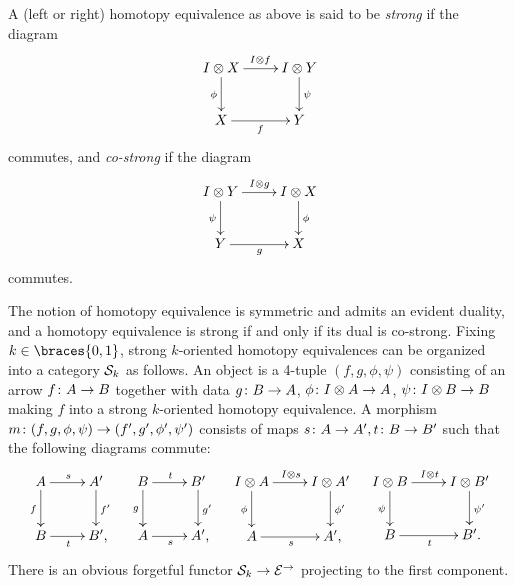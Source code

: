 \documentclass[reqno,10pt,a4paper,oneside,draft]{amsart}
\begin{document}
\begin{definition} \label{def:strhe}
A (left or right) homotopy equivalence as above is said to be \emph{strong} if the diagram
\[
\xymatrix{
  \interval \otimes X
  \ar[r]^{\interval \otimes f}
  \ar[d]_{\phi}
&
  \interval \otimes Y
  \ar[d]^{\psi}
\\
  X
  \ar[r]_{f}
&
  Y
}
\]
commutes, and \emph{co-strong} if the diagram
\[
\xymatrix{
  \interval \otimes Y
  \ar[r]^{\interval \otimes g}
  \ar[d]_{\psi}
&
  \interval \otimes X
  \ar[d]^{\phi}
\\
  Y
  \ar[r]_{g}
&
  X
}
\]
commutes.
\end{definition}

The notion of homotopy equivalence is symmetric and admits an evident duality, and a homotopy equivalence is strong if and only if its dual is co-strong.
Fixing $k \in \braces{0, 1}$, strong $k$-oriented homotopy equivalences can be organized into a category $\cal{S}_k$ as follows.
An object is a 4-tuple $(f, g, \phi, \psi)$ consisting of an arrow $f \co A \to B$ together with data $g \co B \to A$, $\phi \co \interval \otimes A \to A$, $\psi \co \interval \otimes B \to B$ making $f$ into a strong $k$-oriented homotopy equivalence.
A morphism $m \co (f, g, \phi, \psi) \to (f', g', \phi', \psi')$ consists of maps $s \co A \to A', t \co B \to B'$ such that the following diagrams commute:
\begin{align*}
\xymatrix{
  A
  \ar[r]^{s}
  \ar[d]_{f}
&
  A'
  \ar[d]^{f'}
\\
  B
  \ar[r]_{t}
&
  B'
\rlap{,}}
&&
\xymatrix{
  B
  \ar[r]^{t}
  \ar[d]_{g}
&
  B'
  \ar[d]^{g'}
\\
  A
  \ar[r]_{s}
&
  A'
\rlap{,}}
&&
\xymatrix{
  \interval \otimes A
  \ar[d]_{\phi}
  \ar[r]^{\interval \otimes s}
&
  I \otimes A'
  \ar[d]^{\phi'}
\\
  A
  \ar[r]_{s}
&
  A'
\rlap{,}}
&&
\xymatrix{
  \interval \otimes B
  \ar[d]_{\psi}
  \ar[r]^{\interval \otimes t}
&
  I \otimes B'
  \ar[d]^{\psi'}
\\
  B
  \ar[r]_{t}
&
  B'
\rlap{.}}
\end{align*}
There is an obvious forgetful functor $\cal{S}_k \to \catE^\to$ projecting to the first component.
\end{document}
